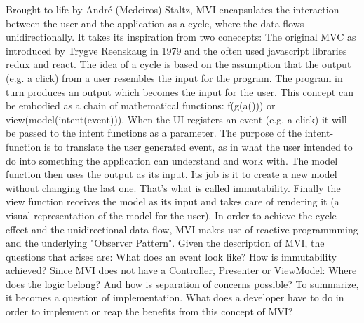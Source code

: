 Brought to life by André (Medeiros) Staltz, MVI encapsulates the interaction between the user and the application as a cycle, where the data flows unidirectionally.
It takes its inspiration from two conecepts: The original MVC as introduced by Trygve Reenskaug in 1979 and the often used javascript libraries redux and react. 
The idea of a cycle is based on the assumption that the output (e.g. a click) from a user resembles the input for the program. The program in turn produces an output 
which becomes the input for the user. This concept can be embodied as a chain of mathematical functions: f(g(a())) or view(model(intent(event))).
When the UI registers an event (e.g. a click) it will be passed to the intent functions as a parameter. The purpose of the intent-function is 
to translate the user generated event, as in what the user intended to do into something the application can understand and work with.
The model function then uses the output as its input. Its job is it to create a new model without changing the last one. That's what is called immutability.
Finally the view function receives the model as its input and takes care of rendering it (a visual representation of the model for the user). 
In order to achieve the cycle effect and the unidirectional data flow, MVI makes use of reactive programmming and the underlying "Observer Pattern".
Given the description of MVI, the questions that arises are: What does an event look like? How is immutability achieved?
Since MVI does not have a Controller, Presenter or ViewModel: Where does the logic belong? And how is separation of concerns possible?
To summarize, it becomes a question of implementation. What does a developer have to do in order to implement or reap the benefits from this concept of MVI?

